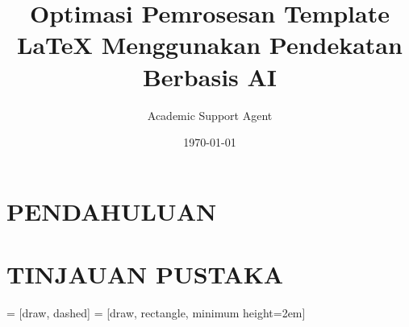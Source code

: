 \documentclass{csbachelor}
\title{Optimasi Pemrosesan Template LaTeX Menggunakan Pendekatan Berbasis AI}
\author{Academic Support Agent}
\date{\today}
\begin{document}
\maketitle

\begin{abstract}

\end{abstract}

\chapter{PENDAHULUAN}


\chapter{TINJAUAN PUSTAKA}




\usepackage{url}
\usepackage{subfigure}

\usepackage[hidelinks]{hyperref}
\setlength{\LTpre}{1em}
\setlength{\LTpost}{1em}

\usepackage{tikz}
\usetikzlibrary{arrows,backgrounds,fit,shapes}
 = [draw, dashed]
 = [draw, rectangle, minimum height=2em]
\tikzset{>=latex}

\DeclareMathOperator*{\argmin}{arg\,min}
\DeclareMathOperator*{\argmax}{arg\,max}

\end{document}

